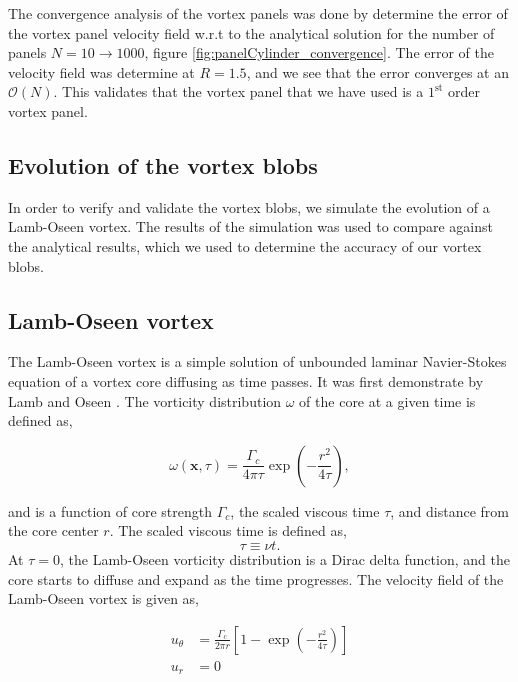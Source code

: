 The convergence analysis of the vortex panels was done by determine the error of the vortex panel velocity field w.r.t to the analytical solution for the number of panels $N = 10 \rightarrow 1000$, figure \ref{fig:panelCylinder_convergence}. The error of the velocity field was determine at $R = 1.5$, and we see that the error converges at an $\mathcal{O}\left(N\right)$. This validates that the vortex panel that we have used is a $1^{\mathrm{st}}$ order vortex panel.

\subsection{Evolution of the vortex blobs}

In order to verify and validate the vortex blobs, we simulate the evolution of a Lamb-Oseen vortex. The results of the simulation was used to compare against the analytical results, which we used to determine the accuracy of our vortex blobs.

\subsection*{Lamb-Oseen vortex}
\label{subsec:lagrangianLambOseen}
The Lamb-Oseen vortex is a simple solution of unbounded laminar Navier-Stokes equation of a vortex core diffusing as time passes. It was first demonstrate by Lamb and Oseen \cite{Tryggeson2007}. The vorticity distribution $\omega$ of the core at a given time is defined as,

	\begin{equation}
	\omega\left(\mathbf{x},\tau\right) = \frac{\Gamma_c}{4\pi\tau} \exp\left(-\frac{r^2}{4\tau}\right),
	\end{equation}

and is a function of core strength $\Gamma_c$, the scaled viscous time $\tau$, and distance from the core center $r$. The scaled viscous time is defined as,
	\begin{equation}
	\tau \equiv \nu t.
	\end{equation}
At $\tau=0$, the Lamb-Oseen vorticity distribution is a Dirac delta function, and the core starts to diffuse and expand as the time progresses. The velocity field of the Lamb-Oseen vortex is given as,

	\begin{subequations}
	\begin{align}
	u_{\theta} &= \frac{\Gamma_c}{2\pi r} \left[1-\exp\left(-\frac{r^2}{4\tau}\right)\right]\\
	u_r &= 0
	\end{align}
	\end{subequations}

